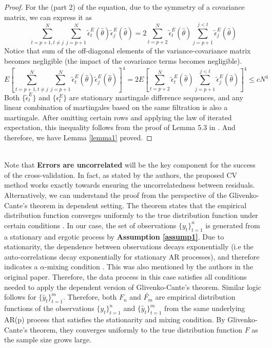 \documentclass[12pt, oneside]{amsart}
\theoremstyle{definition}
\theoremstyle{remark}
\numberwithin{equation}{section}
\begin{document}
\begin{proof}
For the (part 2) of the equation, due to the symmetry of a covariance matrix, we can express it as
$$\sum^N_{t=p+1, t\not = j} \sum^N_{j=p+1} \tilde{\epsilon}^E_t(\hat{\theta}) \tilde{\epsilon}^E_j(\hat{\theta}) = 2 
\sum^N_{t=p+2}\tilde{\epsilon}^E_t(\hat{\theta}) 
\sum^{j < t}_{j=p+1} \tilde{\epsilon}^E_j(\hat{\theta})
$$
Notice that sum of the off-diagonal elements of the variance-covariance matrix becomes negligible (the impact of the covariance terms becomes negligible). 
$$E \left[ \sum^N_{t=p+1, t\not = j} \sum^N_{j=p+1} \tilde{\epsilon}^E_t(\hat{\theta}) \tilde{\epsilon}^E_j(\hat{\theta}) \right]^4 = 2 E \left[
\sum^N_{t=p+2}\tilde{\epsilon}^E_t(\hat{\theta}) 
\sum^{j < t}_{j=p+1} \tilde{\epsilon}^E_j(\hat{\theta}) \right]^4 \leq cN^4
$$
Both $\{ \tilde{\epsilon}^E_t  \}$ and $\{\epsilon^E_t\}$ are stationary martingale difference sequences, and any linear combination of martingales based on the same filtration is also a martingale. After omitting certain rows and applying the law of iterated expectation, this inequality follows from the proof of Lemma 5.3 in \citep{Burman1992}. And therefore, we have Lemma \ref{lemma1} proved. \end{proof}
\\

Note that \textbf{Errors are uncorrelated} will be the key component for the success of the cross-validation. In fact, as stated by the authors, the proposed CV method works exactly towards ensuring the uncorrelatedness between residuals. Alternatively, we can understand the proof from the perspective of the Glivenko-Cante's theorem in dependent setting. The theorem states that the empirical distribution function converges uniformly to the true distribution function under certain conditions \citep{Doukhan, Bradley}. In our case, the set of observations $\{y_t\}_{t=1}^n$ is generated from a stationary and ergotic process by \textbf{Assumption \ref{assump1}}. Due to stationarity, the dependence between observations decays exponentially (i.e the auto-correlations decay exponentially \citep{Takemura2016} for stationary AR processes),  and therefore indicates a $\alpha$-mixing condition \citep{Brockwell}. This was also mentioned by the authors in the original paper. Therefore, the data process in this case satisfies all conditions needed to apply the dependent version of Glivenko-Cante's theorem. Similar logic follows for $\{\tilde{y_t}\}_{t=1}^m$. Therefore, both $F_n$ and $\tilde{F_m}$ are empirical distribution functions of the observations $\{y_t\}_{t=1}^n$ and $\{\tilde{y_t}\}_{t=1}^m$ from the same underlying AR(p) process that satisfies the stationarity and mixing condition. By Glivenko-Cante's theorem, they converges uniformly to the true distribution function $F$ as the sample size grows large. 
\end{document}
